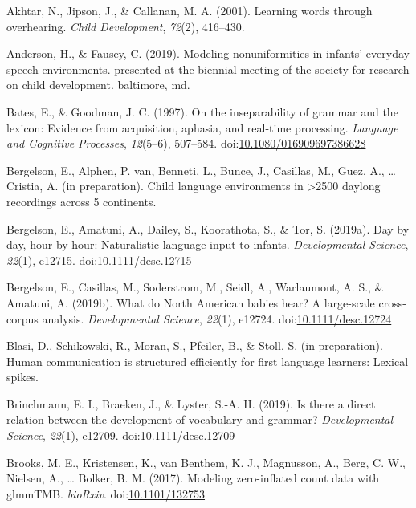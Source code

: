 \documentclass[,man,mask,floatsintext]{apa6}
\begin{document}
\hypertarget{ref-akhtar2001learning}{}
Akhtar, N., Jipson, J., \& Callanan, M. A. (2001). Learning words
through overhearing. \emph{Child Development}, \emph{72}(2), 416--430.

\hypertarget{ref-anderson2019modeling}{}
Anderson, H., \& Fausey, C. (2019). Modeling nonuniformities in infants'
everyday speech environments. presented at the biennial meeting of the
society for research on child development. baltimore, md.

\hypertarget{ref-bates1997inseparability}{}
Bates, E., \& Goodman, J. C. (1997). On the inseparability of grammar
and the lexicon: Evidence from acquisition, aphasia, and real-time
processing. \emph{Language and Cognitive Processes}, \emph{12}(5--6),
507--584.
doi:\href{https://doi.org/10.1080/016909697386628}{10.1080/016909697386628}

\hypertarget{ref-bergelsonIPbsl}{}
Bergelson, E., Alphen, P. van, Benneti, L., Bunce, J., Casillas, M.,
Guez, A., \ldots{} Cristia, A. (in preparation). Child language
environments in \textgreater{}2500 daylong recordings across 5
continents.

\hypertarget{ref-bergelson2019day}{}
Bergelson, E., Amatuni, A., Dailey, S., Koorathota, S., \& Tor, S.
(2019a). Day by day, hour by hour: Naturalistic language input to
infants. \emph{Developmental Science}, \emph{22}(1), e12715.
doi:\href{https://doi.org/10.1111/desc.12715}{10.1111/desc.12715}

\hypertarget{ref-bergelsoncasillas2019what}{}
Bergelson, E., Casillas, M., Soderstrom, M., Seidl, A., Warlaumont, A.
S., \& Amatuni, A. (2019b). What do North American babies hear? A
large-scale cross-corpus analysis. \emph{Developmental Science},
\emph{22}(1), e12724.
doi:\href{https://doi.org/10.1111/desc.12724}{10.1111/desc.12724}

\hypertarget{ref-blasiIPhuman}{}
Blasi, D., Schikowski, R., Moran, S., Pfeiler, B., \& Stoll, S. (in
preparation). Human communication is structured efficiently for first
language learners: Lexical spikes.

\hypertarget{ref-brinchmann2019direct}{}
Brinchmann, E. I., Braeken, J., \& Lyster, S.-A. H. (2019). Is there a
direct relation between the development of vocabulary and grammar?
\emph{Developmental Science}, \emph{22}(1), e12709.
doi:\href{https://doi.org/10.1111/desc.12709}{10.1111/desc.12709}

\hypertarget{ref-brooks2017modeling}{}
Brooks, M. E., Kristensen, K., van Benthem, K. J., Magnusson, A., Berg,
C. W., Nielsen, A., \ldots{} Bolker, B. M. (2017). Modeling
zero-inflated count data with glmmTMB. \emph{bioRxiv}.
doi:\href{https://doi.org/10.1101/132753}{10.1101/132753}
\end{document}

